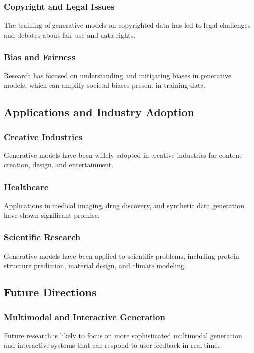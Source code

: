 \subsubsection*{Copyright and Legal Issues}
The training of generative models on copyrighted data has led to legal challenges and debates about fair use and data rights.

\subsubsection*{Bias and Fairness}
Research has focused on understanding and mitigating biases in generative models, which can amplify societal biases present in training data.

\subsection*{Applications and Industry Adoption}

\subsubsection*{Creative Industries}
Generative models have been widely adopted in creative industries for content creation, design, and entertainment.

\subsubsection*{Healthcare}
Applications in medical imaging, drug discovery, and synthetic data generation have shown significant promise.

\subsubsection*{Scientific Research}
Generative models have been applied to scientific problems, including protein structure prediction, material design, and climate modeling.

\subsection*{Future Directions}

\subsubsection*{Multimodal and Interactive Generation}
Future research is likely to focus on more sophisticated multimodal generation and interactive systems that can respond to user feedback in real-time.

